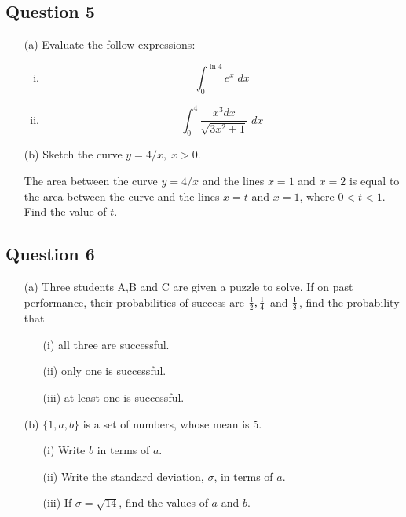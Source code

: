 \documentclass[12pt]{article}
\begin{document}
\newpage
\subsection*{Question 5}

\begin{itemize}

\item[(a)] Evaluate the follow expressions:

\begin{multicols}{2}
	\begin{enumerate}[(i)]
		
		\item $$ \int^{\ln 4}_{0} e^x \; dx $$
		
		\item $$ \int^{4}_{0} \frac{x^3dx}{\sqrt{3x^2+1}}\; dx $$
		
		
	\end{enumerate}
\end{multicols}
\item[(b)] Sketch the curve $y = 4/x,\; x > 0$.

\medskip

The area between the curve $ \displaystyle y = 4/x$ and the lines $x=1$ and $x=2$ is equal to the area between the 
curve and the lines $x=t$ and $x=1$, where $0 <t<1$. Find the value of $t$.


\end{itemize}


\medskip
\subsection*{Question 6}

\begin{itemize}

\item[(a)]
Three students A,B and C are given a puzzle to solve. If on past performance, their probabilities of success are ${1 \over 2}, {1 \over 4}$ and ${1 \over 3}$, find the probability that
\begin{itemize}
	\item[(i)] all three are successful.
	\item[(ii)] only one is successful.
	\item[(iii)] at least one is successful.
\end{itemize}

\item[(b)] $\{1,a,b\}$ is a set of numbers, whose mean is 5.
\begin{itemize}
	\item[(i)] Write $b$ in terms of $a$.
	\item[(ii)] Write the standard deviation, $\sigma$, in terms of $a$.
\item[(iii)]If $\sigma = \sqrt{14}$, find the values of $a$ and $b$.
\end{itemize}




\end{itemize}
\end{document}
